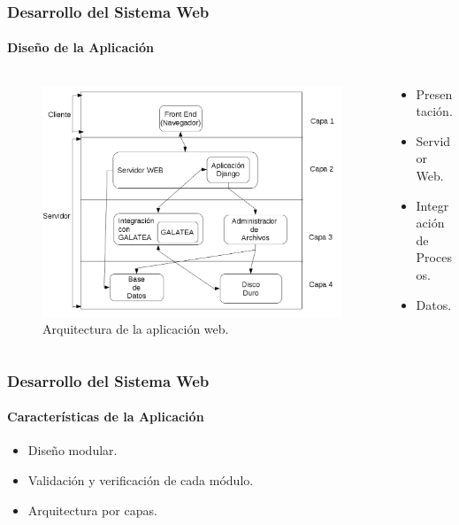\documentclass[spanish,xcolor=dvipsnames]{beamer}
\begin{document}
    \begin{frame}
    	\frametitle{Desarrollo del Sistema Web}
    	\framesubtitle{Diseño de la Aplicación}
    	
    	\begin{columns}
    		\begin{column}{.7\linewidth}
    			\begin{figure}[H]
    				\centering
    				\includegraphics[scale=0.29]{img/arquitecturaAplicacion.png}
    				\caption{Arquitectura de la aplicación web.}
    				\label{arquitecturaAplicacion}
    			\end{figure}
    		\end{column}
    		\begin{column}{.3\linewidth}
    			\begin{itemize}
    				\item Presentación.
    				\item Servidor Web.
    				\item Integración de Procesos.
    				\item Datos.
    			\end{itemize}
    		\end{column}
    		
    	\end{columns}
    	
    \end{frame}
    \begin{frame}
    	\frametitle{Desarrollo del Sistema Web}
    	\framesubtitle{Características de la Aplicación}
    	
    	\begin{itemize}
    		\item Diseño modular.
    		\item Validación y verificación de cada módulo.
    		\item Arquitectura por capas.
    	\end{itemize}
    	
    \end{frame}
    
\end{document}
